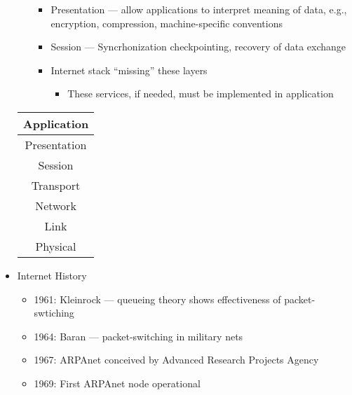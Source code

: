 \begin{itemize}
\begin{itemize}
\begin{itemize}
          \item Presentation — allow applications to interpret meaning of data, e.g., encryption, compression, machine-specific conventions

          \item Session — Syncrhonization checkpointing, recovery of data exchange

          \item Internet stack ``missing'' these layers

            \begin{itemize}

              \item These services, if needed, must be implemented in application

            \end{itemize}

        \end{itemize}

    \end{itemize}

    \begin{center}
      \begin{tabular}[H]{|c|}
        \hline
        Application\\
        \hline
        Presentation\\
        \hline
        Session\\
        \hline
        Transport\\
        \hline
        Network\\
        \hline
        Link\\
        \hline
        Physical\\
        \hline
      \end{tabular}
    \end{center}

  \item Internet History

    \begin{itemize}

      \item 1961: Kleinrock — queueing theory shows effectiveness of packet-swtiching

      \item 1964: Baran — packet-switching in military nets

      \item 1967: ARPAnet conceived by Advanced Research Projects Agency

      \item 1969: First ARPAnet node operational


\end{itemize}
\end{itemize}
